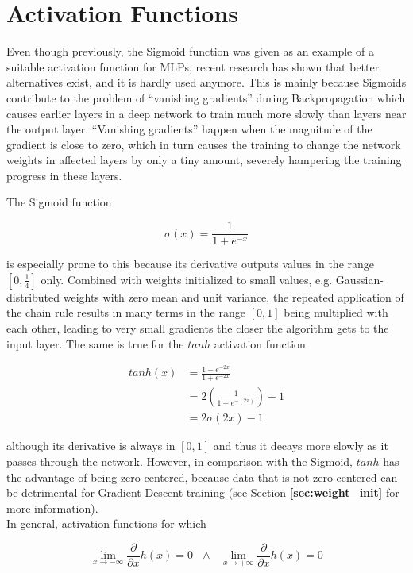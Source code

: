 	\section {Activation Functions}
Even though previously, the Sigmoid function was given as an example of a suitable activation function for MLPs, recent research \cite{glorot, rectifiers} has shown that better alternatives exist, and it is hardly used anymore. This is mainly because Sigmoids contribute to the problem of ``vanishing gradients'' during Backpropagation which causes earlier layers in a deep network to train much more slowly than layers near the output layer. ``Vanishing gradients'' happen when the magnitude of the gradient is close to zero, which in turn causes the training to change the network weights in affected layers by only a tiny amount, severely hampering the training progress in these layers.

The Sigmoid function

\[ \sigma(x) = \frac{1}{1 + e^{-x}} \]

\noindent is especially prone to this because its derivative outputs values in the range $\left [0, \frac{1}{4} \right ]$ only. Combined with weights initialized to small values, e.g. Gaussian-distributed weights with zero mean and unit variance, the repeated application of the chain rule results in many terms in the range $\left [0, 1\right ]$ being multiplied with each other, leading to very small gradients the closer the algorithm gets to the input layer. The same is true for the $tanh$ activation function

\begin {align}
	tanh(x) &= \frac{1 - e^{-2x}}{1 + e^{-2x}}\\
		  &= 2 \left ( \frac{1}{1 + e^{-(2x)}} \right ) - 1\\
		  &= 2 \sigma(2x) - 1
\end {align}

\noindent although its derivative is always in $[0, 1]$ and thus it decays more slowly as it passes through the network. However, in comparison with the Sigmoid, $tanh$ has the advantage of being zero-centered, because data that is not zero-centered can be detrimental for Gradient Descent training (see Section \textbf{\ref{sec:weight_init}} for more information).\\

In general, activation functions for which

\[ \lim \limits_{x \rightarrow -\infty} \frac{\partial}{\partial x} h(x) = 0 \,\,\,\, \land \,\,\,\,  \lim \limits_{x \rightarrow +\infty} \frac{\partial}{\partial x} h(x) = 0 \label{eq:saturation} \]

